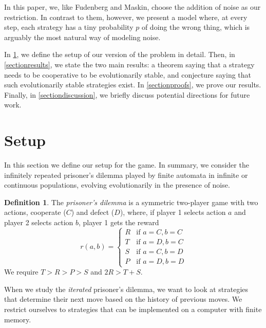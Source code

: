 \documentclass[12pt]{article}
\theoremstyle{definition}
\newtheorem{definition}[theorem]{Definition}
\theoremstyle{remark}
\begin{document}
In this paper, we, like Fudenberg and Maskin, choose the addition of noise as our restriction. In contrast to them, however, we present a model where, at every step, each strategy has a tiny probability $p$ of doing the wrong thing, which is arguably the most natural way of modeling noise. 

In \cref{sectionsetup}, we define the setup of our version of the problem in detail. Then, in \cref{sectionresults}, we state the two main results: a theorem saying that a strategy needs to be cooperative to be evolutionarily stable, and conjecture saying that such evolutionarily stable strategies exist. In \cref{sectionproofs}, we prove our results. Finally, in \cref{sectiondiscussion}, we briefly discuss potential directions for future work.

\section{Setup}
\label{sectionsetup}

In this section we define our setup for the game. In summary, we consider the infinitely repeated prisoner's dilemma played by finite automata in infinite or continuous populations, evolving evolutionarily in the presence of noise.



\begin{definition}
  The \textit{prisoner's dilemma} is a symmetric two-player game with two actions, cooperate ($C$) and defect ($D$), where, if player 1 selects action $a$ and player 2 selects action $b$, player 1 gets the reward
  \begin{equation*}
    r(a,b) = \begin{cases}
      R &\text{if $a = C, b = C$} \\
      T &\text{if $a = D, b = C$} \\
      S &\text{if $a = C, b = D$} \\
      P &\text{if $a = D, b = D$}
    \end{cases}
  \end{equation*}
  We require $T > R > P > S$ and $2R > T + S$.
\end{definition}

When we study the \textit{iterated} prisoner's dilemma, we want to look at strategies that determine their next move based on the history of previous moves. We restrict ourselves to strategies that can be implemented on a computer with finite memory.
\end{document}
